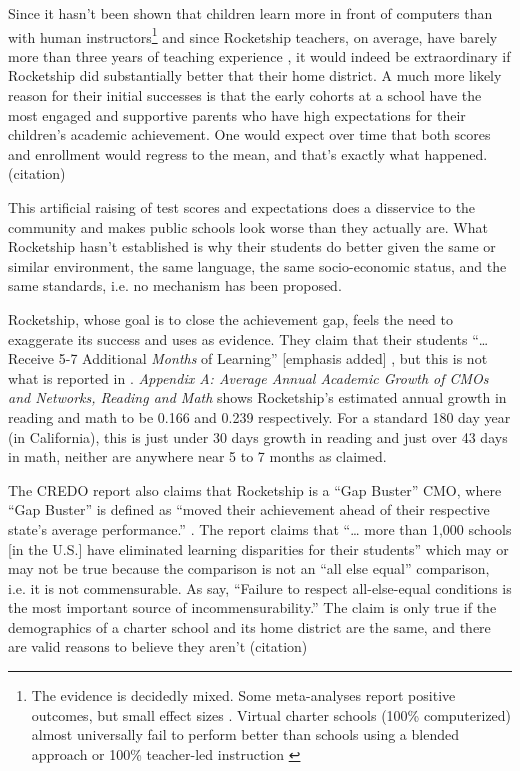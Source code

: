 Since it hasn't been shown that children learn more in front of computers than with human instructors\footnote{The evidence is decidedly mixed. Some meta-analyses report positive outcomes, but small effect sizes \parencite{}. Virtual charter schools (100\% computerized) almost universally fail to perform better than schools using a blended approach or 100\% teacher-led instruction \parencite{}} and since Rocketship teachers, on average, have barely more than three years of teaching experience \parencite{}, it would indeed be extraordinary if Rocketship did substantially better that their home district. A much more likely reason for their initial successes is that the early cohorts at a school have the most engaged and supportive parents who have high expectations for their children's academic achievement. One would expect over time that both scores and enrollment would regress to the mean, and that's exactly what happened. (citation)

This artificial raising of test scores and expectations does a disservice to the community and makes public schools look worse than they actually are. What Rocketship hasn't established is why their students do better given the same or similar environment, the same language, the same socio-economic status, and the same standards, i.e. no mechanism has been proposed.

Rocketship, whose goal is to close the achievement gap, feels the need to exaggerate its success and uses \textcite{Raymond.etal2023} as evidence. They claim that their students ``\ldots{} Receive 5-7 Additional \textit{Months} of Learning'' [emphasis added] \parencite{RSED2023}, but this is not what is reported in \textcite{Raymond.etal2023}. \textit{Appendix A: Average Annual Academic Growth of CMOs and Networks, Reading and Math} \textcite[132]{Raymond.etal2023} shows Rocketship's estimated annual growth in reading and math to be 0.166 and 0.239 respectively. For a standard 180 day year (in California), this is just under 30 days growth in reading and just over 43 days in math, neither are anywhere near 5 to 7 months as claimed.

The CREDO report also claims that Rocketship is a ``Gap Buster'' CMO, where ``Gap Buster'' is defined as ``moved their achievement ahead of their respective state’s average performance.'' \parencite[14]{Raymond.etal2023}. The report claims that ``\ldots{} more than 1,000 schools [in the U.S.] have eliminated learning disparities for their students'' \parencite[14]{Raymond.etal2023} which may or may not be true because the comparison is not an ``all else equal'' comparison, i.e. it is not commensurable. As \textcite[16]{Ashworth.etal2021} say, ``Failure to respect all-else-equal conditions is the most important source of incommensurability.'' The claim is only true if the demographics of a charter school and its home district are the same, and there are valid reasons to believe they aren't (citation)

